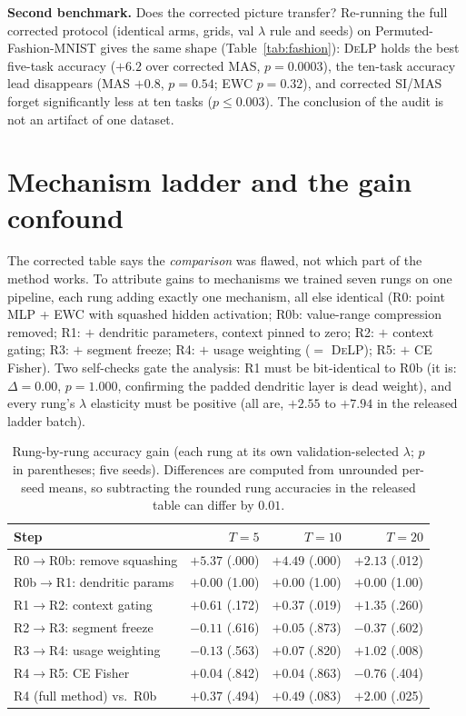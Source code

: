 \documentclass[conference]{IEEEtran}
\newcommand{\delp}{\textsc{DeLP}}
\begin{document}
\noindent\textbf{Second benchmark.} Does the corrected picture transfer? Re-running the full
corrected protocol (identical arms, grids, val $\lambda$ rule and seeds) on Permuted-Fashion-MNIST
gives the same shape (Table~\ref{tab:fashion}): \delp{} holds the best five-task accuracy
($+6.2$ over corrected MAS, $p=0.0003$), the ten-task accuracy lead disappears (MAS $+0.8$,
$p=0.54$; EWC $p=0.32$), and corrected SI/MAS forget significantly less at ten tasks
($p\leq0.003$). The conclusion of the audit is not an artifact of one dataset.

\section{Mechanism ladder and the gain confound}\label{sec:ladder}
The corrected table says the \emph{comparison} was flawed, not which part of the method works. To
attribute gains to mechanisms we trained seven rungs on one pipeline, each rung adding exactly one
mechanism, all else identical (R0: point MLP + EWC with squashed hidden activation;
R0b: value-range compression removed; R1: $+$ dendritic parameters, context pinned to zero;
R2: $+$ context gating; R3: $+$ segment freeze; R4: $+$ usage weighting ($=$ \delp{}); R5: $+$ CE
Fisher). Two self-checks gate the analysis: R1 must be bit-identical to R0b (it is: $\Delta=0.00$,
$p=1.000$, confirming the padded dendritic layer is dead weight), and every rung's $\lambda$
elasticity must be positive (all are, $+2.55$ to $+7.94$ in the released ladder batch).

\begin{table}[t]
\centering
\caption{Rung-by-rung accuracy gain (each rung at its own validation-selected $\lambda$; $p$ in
parentheses; five seeds). Differences are computed from unrounded per-seed means, so
subtracting the rounded rung accuracies in the released table can differ by $0.01$.}
\label{tab:ladder}
\footnotesize
\setlength{\tabcolsep}{3.5pt}
\begin{tabular}{@{}lrrr@{}}
\toprule
Step & $T{=}5$ & $T{=}10$ & $T{=}20$ \\
\midrule
R0$\to$R0b: remove squashing   & $+5.37$ (.000) & $+4.49$ (.000) & $+2.13$ (.012) \\
R0b$\to$R1: dendritic params   & $+0.00$ (1.00) & $+0.00$ (1.00) & $+0.00$ (1.00) \\
R1$\to$R2: context gating      & $+0.61$ (.172) & $+0.37$ (.019) & $+1.35$ (.260) \\
R2$\to$R3: segment freeze      & $-0.11$ (.616) & $+0.05$ (.873) & $-0.37$ (.602) \\
R3$\to$R4: usage weighting     & $-0.13$ (.563) & $+0.07$ (.820) & $+1.02$ (.008) \\
R4$\to$R5: CE Fisher           & $+0.04$ (.842) & $+0.04$ (.863) & $-0.76$ (.404) \\
\midrule
R4 (full method) vs.\ R0b      & $+0.37$ (.494) & $+0.49$ (.083) & $+2.00$ (.025) \\
\bottomrule
\end{tabular}
\end{table}
\end{document}

